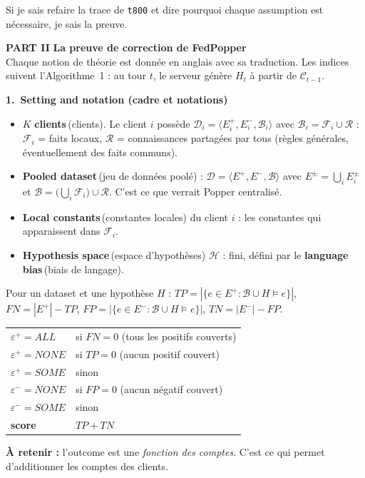 \documentclass[10pt]{article}
\newcommand{\EN}[2]{\textbf{#1}\,{\scriptsize\textcolor{marine}{(#2)}}}
\newcommand{\titrebox}[2]{\needspace{10\baselineskip}\vspace{8pt}
  \begin{tcolorbox}[colback=marine, colframe=marine, arc=0pt, boxrule=0pt,
    top=4pt, bottom=4pt, left=8pt]
  \color{white}\Large\bfseries #1.~#2
  \end{tcolorbox}\vspace{2pt}}
\newcommand{\ce}[1]{\begin{pourquoi}\textbf{\textcolor{marine}{À retenir :}} #1\end{pourquoi}}
\newcommand{\st}[1]{\par\needspace{7\baselineskip}\vspace{5pt}{\normalsize\bfseries\textcolor{marine}{#1}}\par\vspace{2pt}}
\newcommand{\partie}[3]{\newpage
  \begin{tcolorbox}[colback=pastel, colframe=pastel, arc=0pt, boxrule=0pt,
    top=8pt, bottom=8pt, left=10pt]
  {\fontsize{26}{28}\selectfont\bfseries\textcolor{marine}{PART #1}}\quad
  {\Large\bfseries\textcolor{encre}{#2}}\\[2pt]{\small #3}
  \end{tcolorbox}\vspace{4pt}}
\begin{document}
\vspace{8pt}
\begin{tcolorbox}[colback=marine, colframe=marine, arc=0pt, boxrule=0pt,
  halign=center, top=4pt, bottom=4pt]
\color{white}\small Si je sais refaire la trace de \texttt{t800} et dire pourquoi chaque assumption est nécessaire, je sais la preuve.
\end{tcolorbox}

\partie{II}{La preuve de correction de FedPopper}{Chaque notion de théorie est donnée en anglais avec sa traduction. Les indices suivent l'Algorithme~1 : au tour $t$, le serveur génère $H_t$ à partir de $\mathcal{C}_{t-1}$.}

\titrebox{1}{Setting and notation (cadre et notations)}

\st{Les objets}
\begin{itemize}
  \item $K$ \EN{clients}{clients}. Le client $i$ possède $\mathcal{D}_i=\langle E_i^+,E_i^-,\mathcal{B}_i\rangle$ avec $\mathcal{B}_i=\mathcal{F}_i\cup\mathcal{R}$ :
        $\mathcal{F}_i$ = faits locaux, $\mathcal{R}$ = connaissances partagées par tous (règles générales, éventuellement des faits communs).
  \item \EN{Pooled dataset}{jeu de données poolé} : $\mathcal{D}=\langle E^+,E^-,\mathcal{B}\rangle$ avec $E^\pm=\bigcup_iE_i^\pm$ et
        $\mathcal{B}=\bigl(\bigcup_i\mathcal{F}_i\bigr)\cup\mathcal{R}$. C'est ce que verrait Popper centralisé.
  \item \EN{Local constants}{constantes locales} du client $i$ : les constantes qui apparaissent dans $\mathcal{F}_i$.
  \item \EN{Hypothesis space}{espace d'hypothèses} $\mathcal{H}$ : fini, défini par le \EN{language bias}{biais de langage}.
\end{itemize}

\st{Confusion matrix, outcome, score}
Pour un dataset et une hypothèse $H$ : $TP=|\{e\in E^+:\mathcal{B}\cup H\models e\}|$, $FN=|E^+|-TP$,
$FP=|\{e\in E^-:\mathcal{B}\cup H\models e\}|$, $TN=|E^-|-FP$.
\begin{center}
\begin{tabular}{@{}l l@{}}
$\varepsilon^+=\mathit{ALL}$ & si $FN=0$ (tous les positifs couverts)\\
$\varepsilon^+=\mathit{NONE}$ & si $TP=0$ (aucun positif couvert)\\
$\varepsilon^+=\mathit{SOME}$ & sinon\\
$\varepsilon^-=\mathit{NONE}$ & si $FP=0$ (aucun négatif couvert)\\
$\varepsilon^-=\mathit{SOME}$ & sinon\\
\textbf{score} & $TP+TN$\\
\end{tabular}
\end{center}
\ce{l'outcome est une \emph{fonction des comptes}. C'est ce qui permet d'additionner les comptes des clients.}
\end{document}
